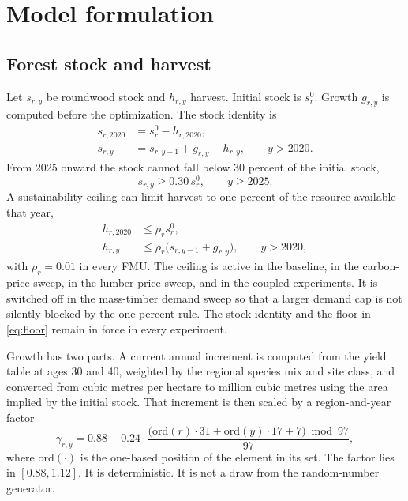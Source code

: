 \documentclass[11pt]{article}
\begin{document}
\section{Model formulation}
\label{sec:model}

\subsection{Forest stock and harvest}

Let $s_{r,y}$ be roundwood stock and $h_{r,y}$ harvest. Initial stock is $s^0_r$. Growth $g_{r,y}$ is computed before the optimization. The stock identity is
\begin{align}
s_{r,2020} &= s^0_r - h_{r,2020}, \label{eq:stock1} \\
s_{r,y} &= s_{r,y-1} + g_{r,y} - h_{r,y}, \qquad y > 2020. \label{eq:stockt}
\end{align}
From 2025 onward the stock cannot fall below 30 percent of the initial stock,
\begin{equation}
s_{r,y} \ge 0.30\, s^0_r, \qquad y \ge 2025.
\label{eq:floor}
\end{equation}
A sustainability ceiling can limit harvest to one percent of the resource available that year,
\begin{align}
h_{r,2020} &\le \rho_r s^0_r, \label{eq:cap1} \\
h_{r,y} &\le \rho_r \bigl(s_{r,y-1} + g_{r,y}\bigr), \qquad y > 2020, \label{eq:capt}
\end{align}
with $\rho_r = 0.01$ in every FMU. The ceiling is active in the baseline, in the carbon-price sweep, in the lumber-price sweep, and in the coupled experiments. It is switched off in the mass-timber demand sweep so that a larger demand cap is not silently blocked by the one-percent rule. The stock identity and the floor in \eqref{eq:floor} remain in force in every experiment.

Growth has two parts. A current annual increment is computed from the yield table at ages 30 and 40, weighted by the regional species mix and site class, and converted from cubic metres per hectare to million cubic metres using the area implied by the initial stock. That increment is then scaled by a region-and-year factor
\begin{equation}
\gamma_{r,y} = 0.88 + 0.24 \cdot \frac{\bigl(\mathrm{ord}(r)\cdot 31 + \mathrm{ord}(y)\cdot 17 + 7\bigr) \bmod 97}{97},
\label{eq:gshock}
\end{equation}
where $\mathrm{ord}(\cdot)$ is the one-based position of the element in its set. The factor lies in $[0.88, 1.12]$. It is deterministic. It is not a draw from the random-number generator.
\end{document}
